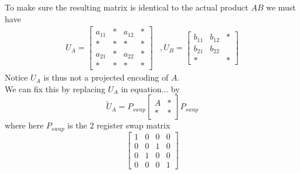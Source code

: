 \documentclass[11pt]{article}
\begin{document}
To make sure the resulting matrix is identical to the actual product $AB$ we must have
\begin{align*}
U_A = \begin{bmatrix} 
a_{11}& * &a_{12} & * \\
* & * & * & * \\
a_{21}& * & a_{22} & * \\
* & * & * & *
\end{bmatrix} & , 
U_B = \left[ \begin{array}{cc|c}
b_{11} & b_{12} & * \\
b_{21} & b_{22} & \\ \hline
* & & * 
\end{array} \right] 
\end{align*}
Notice $U_A$ is thus not a projected encoding of $A$. \\
We can fix this by replacing $U_A$ in equation... by
$$
\tilde{U}_A = P_{swap} \left[ \begin{array}{c|c} 
A & * \\ \hline 
* & * 
\end{array} \right] P_{swap}
$$
where here $P_{swap}$ is the $2$ register swap matrix
$$
\begin{bmatrix} 
1 & 0 & 0 & 0 \\ 
0 & 0 & 1 & 0 \\ 
0 & 1 & 0 & 0 \\ 
0 & 0 & 0 & 1 
\end{bmatrix}
$$


\printbibliography
\end{document}
